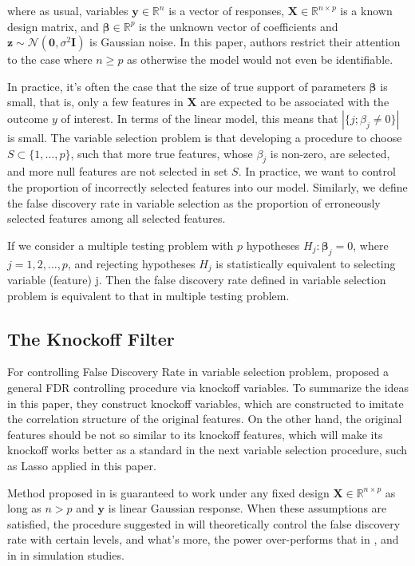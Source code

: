 \documentclass{uwstat572}
\begin{document}
where as usual, variables $\bm{y}\in\mathbb{R}^n$ is a vector of responses, $\bm{X}\in \mathbb{R}^{n\times p}$ is a known design matrix, and $\bm{\beta}\in \mathbb{R}^p$ is the unknown vector of coefficients and $\bm{z}\sim \mathcal{N}(\bm{0}, \sigma^2\bm{I})$ is Gaussian noise. In this paper, authors restrict their attention to the case where $n\geq p$ as otherwise the model would not even be identifiable.

In practice, it's often the case that the size of true support of parameters $\bm{\beta}$ is small, that is, only a few features in $\bm{X}$ are expected to be associated with the outcome $y$ of interest. In terms of the linear model, this means that $|\{j; \beta_j \neq 0 \}|$ is small. The variable selection problem is that developing a procedure to choose $S\subset\{1,\dots, p\}$, such that more true features, whose $\beta_j$ is non-zero, are selected, and more null features are not selected in set $S$. In practice, we want to control the proportion of incorrectly selected features into our model. Similarly, we define the false discovery rate in variable selection as the proportion of erroneously selected features among all selected features.

If we consider a multiple testing problem with $p$ hypotheses $H_j: \bm{\beta}_j = 0$, where $j=1,2,\dots,p$, and rejecting hypotheses $H_j$ is statistically equivalent to selecting variable (feature) j. Then the false discovery rate defined in variable selection problem is equivalent to that in multiple testing problem. 

\subsection{The Knockoff Filter}
For controlling False Discovery Rate in variable selection problem, \cite{barber2015controlling} proposed a general FDR controlling procedure via knockoff variables. To summarize the ideas in this paper, they construct knockoff variables, which are constructed to imitate the correlation structure of the original features. On the other hand, the original features should be not so similar to its knockoff features, which will make its knockoff works better as a standard in the next variable selection procedure, such as Lasso \cite{tibshirani1996regression} applied in this paper.

Method proposed in \cite{barber2015controlling} is guaranteed to work under any fixed design $\bm{X} \in \mathbb{R}^{n\times p}$ as long as $n>p$ and $\bm{y}$ is linear Gaussian response. When these assumptions are satisfied, the procedure suggested in \cite{barber2015controlling} will theoretically control the false discovery rate with certain levels, and what's more, the power over-performs that in \cite{benjamini1995controlling}, and in \cite{benjamini2001control} in simulation studies.
\end{document}
